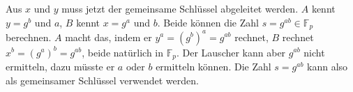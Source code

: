 Aus $x$ und $y$ muss jetzt der gemeinsame Schlüssel abgeleitet werden.
$A$ kennt $y=g^b$ und $a$, $B$ kennt $x=g^a$ und $b$.
Beide können die Zahl $s=g^{ab}\in\mathbb{F}_p$ berechnen.
$A$ macht das, indem er $y^a=(g^b)^a = g^{ab}$ rechnet,
$B$ rechnet $x^b = (g^a)^b = g^{ab}$, beide natürlich in $\mathbb{F}_p$.
Der Lauscher kann aber $g^{ab}$ nicht ermitteln, dazu müsste er
$a$ oder $b$ ermitteln können.
Die Zahl $s=g^{ab}$ kann also als gemeinsamer Schlüssel verwendet
werden.

